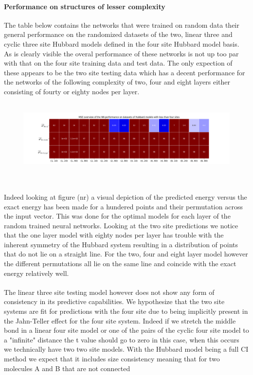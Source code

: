 \documentclass[]{article}
\begin{document}
\paragraph{Performance on structures of lesser complexity}

The table below contains the networks that were trained on random data their general performance on the randomized datasets of the two, linear three and cyclic three site Hubbard models defined in the four site Hubbard model basis. As is clearly visible the overal performance of these networks is not up too par with that on the four site training data and test data. The only expection of these appears to be the two site testing data which has a decent performance for the networks of the following complexity of two, four and eight layers either consisting of fourty or eighty nodes per layer.
\\
\\
\begin{figure}[h]
\centering
\includegraphics[width=\textwidth]{"MSE_OS_random"}
\end{figure}
\\
\\
Indeed looking at figure (nr) a visual depiction of the predicted energy versus the exact energy has been made for a hundered points and their permutation across the input vector. This was done for the optimal models for each layer of the random trained neural networks. Looking at the two site predictions we notice that the one layer model with eighty nodes per layer has trouble with the inherent symmetry of the Hubbard system resulting in a distribution of points that do not lie on a straight line. For the two, four and eight layer model however the different permutations all lie on the same line and coincide with the exact energy relatively well.
\\
\\
The linear three site testing model however does not show any form of consistency in its predictive capabilities. We hypothesize that the two site systems are fit for predictions with the four site  due to being implicitly present in the Jahn-Teller effect for the four site system. Indeed if we stretch the middle bond in a linear four site model or one of the pairs of the cyclic four site model to a "infinite" distance the t value should go to zero in this case, when this occurs we technically have two two site models. With the Hubbard model being a full CI method we expect that it includes size consistency meaning that for two molecules A and B that are not connected
\end{document}
